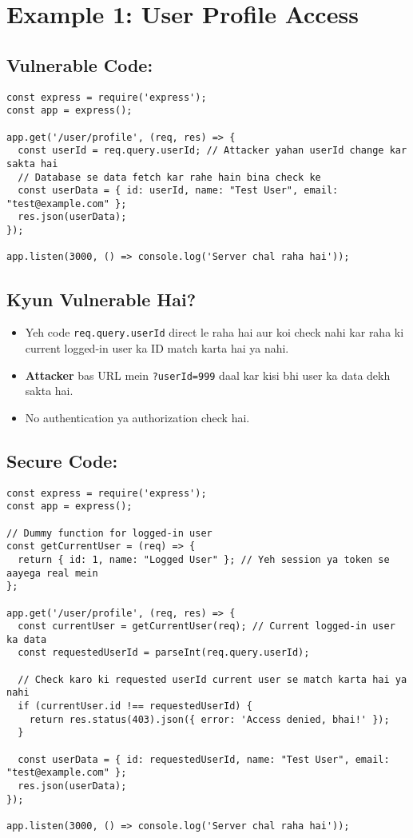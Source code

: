 \documentclass[a4paper, 12pt]{article}
\begin{document}
\section{Example 1: User Profile Access}
\subsection{Vulnerable Code:}
\begin{lstlisting}[caption={Vulnerable User Profile Endpoint}]
const express = require('express');
const app = express();

app.get('/user/profile', (req, res) => {
  const userId = req.query.userId; // Attacker yahan userId change kar sakta hai
  // Database se data fetch kar rahe hain bina check ke
  const userData = { id: userId, name: "Test User", email: "test@example.com" }; 
  res.json(userData);
});

app.listen(3000, () => console.log('Server chal raha hai'));
\end{lstlisting}

\subsection{Kyun Vulnerable Hai?}
\begin{itemize}
    \item Yeh code \texttt{req.query.userId} direct le raha hai aur koi check nahi kar raha ki current logged-in user ka ID match karta hai ya nahi.
    \item \textbf{\color{importantred}Attacker} bas URL mein \texttt{?userId=999} daal kar kisi bhi user ka data dekh sakta hai.
    \item No authentication ya authorization check hai.
\end{itemize}

\subsection{Secure Code:}
\begin{lstlisting}[caption={Secure User Profile Endpoint}]
const express = require('express');
const app = express();

// Dummy function for logged-in user
const getCurrentUser = (req) => {
  return { id: 1, name: "Logged User" }; // Yeh session ya token se aayega real mein
};

app.get('/user/profile', (req, res) => {
  const currentUser = getCurrentUser(req); // Current logged-in user ka data
  const requestedUserId = parseInt(req.query.userId);

  // Check karo ki requested userId current user se match karta hai ya nahi
  if (currentUser.id !== requestedUserId) {
    return res.status(403).json({ error: 'Access denied, bhai!' });
  }

  const userData = { id: requestedUserId, name: "Test User", email: "test@example.com" };
  res.json(userData);
});

app.listen(3000, () => console.log('Server chal raha hai'));
\end{lstlisting}
\end{document}
